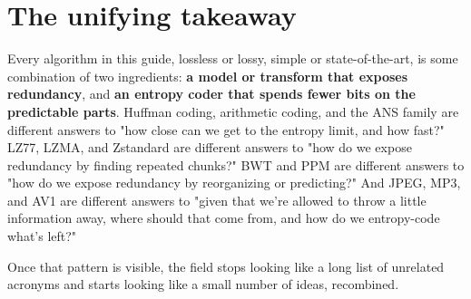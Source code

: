 \documentclass[11pt]{article}
\begin{document}
\section{The unifying takeaway}

Every algorithm in this guide, lossless or lossy, simple or state-of-the-art, is some combination of two ingredients: \textbf{a model or transform that exposes redundancy}, and \textbf{an entropy coder that spends fewer bits on the predictable parts}. Huffman coding, arithmetic coding, and the ANS family are different answers to "how close can we get to the entropy limit, and how fast?" LZ77, LZMA, and Zstandard are different answers to "how do we expose redundancy by finding repeated chunks?" BWT and PPM are different answers to "how do we expose redundancy by reorganizing or predicting?" And JPEG, MP3, and AV1 are different answers to "given that we're allowed to throw a little information away, where should that come from, and how do we entropy-code what's left?"

Once that pattern is visible, the field stops looking like a long list of unrelated acronyms and starts looking like a small number of ideas, recombined.
\end{document}
